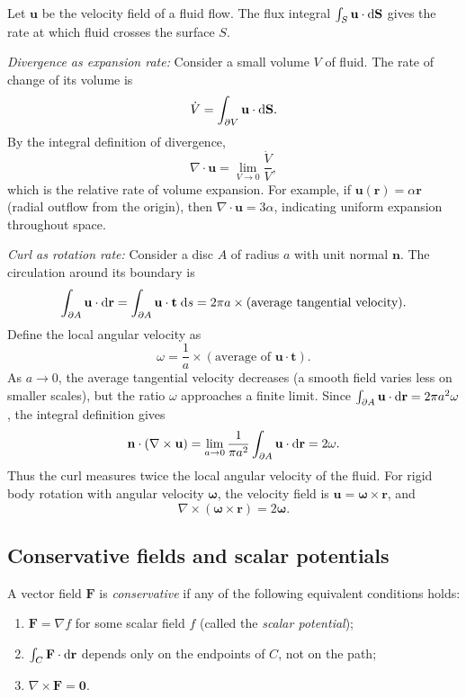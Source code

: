 \documentclass[a4paper]{article}
\begin{document}
\begin{eg}
  Let $\mathbf{u}$ be the velocity field of a fluid flow. The flux integral $\int_S \mathbf{u}\cdot \mathrm{d} \mathbf{S}$ gives the rate at which fluid crosses the surface $S$.

  \emph{Divergence as expansion rate:} Consider a small volume $V$ of fluid. The rate of change of its volume is
  \[
    \dot{V} = \int_{\partial V}\mathbf{u}\cdot \mathrm{d} \mathbf{S}.
  \]
  By the integral definition of divergence,
  \[
    \nabla\cdot \mathbf{u} = \lim_{V\to 0}\frac{\dot{V}}{V},
  \]
  which is the relative rate of volume expansion. For example, if $\mathbf{u}(\mathbf{r}) = \alpha\mathbf{r}$ (radial outflow from the origin), then $\nabla\cdot \mathbf{u} = 3\alpha$, indicating uniform expansion throughout space.

  \emph{Curl as rotation rate:} Consider a disc $A$ of radius $a$ with unit normal $\mathbf{n}$. The circulation around its boundary is
  \[
    \int_{\partial A}\mathbf{u}\cdot \mathrm{d} \mathbf{r} = \int_{\partial A}\mathbf{u}\cdot \mathbf{t} \;\mathrm{d} s = 2\pi a \times (\text{average tangential velocity}).
  \]
  Define the local angular velocity as
  \[
    \omega = \frac{1}{a} \times (\text{average of }\mathbf{u}\cdot \mathbf{t}).
  \]
  As $a \to 0$, the average tangential velocity decreases (a smooth field varies less on smaller scales), but the ratio $\omega$ approaches a finite limit. Since $\int_{\partial A} \mathbf{u}\cdot \mathrm{d} \mathbf{r} = 2\pi a^2 \omega$, the integral definition gives
  \[
    \mathbf{n}\cdot (\nabla \times \mathbf{u}) = \lim_{a \to 0}\frac{1}{\pi a^2}\int_{\partial A}\mathbf{u}\cdot \mathrm{d} \mathbf{r} = 2\omega.
  \]
  Thus the curl measures twice the local angular velocity of the fluid. For rigid body rotation with angular velocity $\boldsymbol\omega$, the velocity field is $\mathbf{u} = \boldsymbol\omega\times \mathbf{r}$, and
  \[
    \nabla\times (\boldsymbol\omega\times \mathbf{r}) = 2\boldsymbol\omega.
  \]
\end{eg}

\subsection{Conservative fields and scalar potentials}
\begin{defi}
  A vector field $\mathbf{F}$ is \emph{conservative} if any of the following equivalent conditions holds:
  \begin{enumerate}
    \item $\mathbf{F} = \nabla f$ for some scalar field $f$ (called the \emph{scalar potential});
    \item $\int_C \mathbf{F}\cdot \mathrm{d} \mathbf{r}$ depends only on the endpoints of $C$, not on the path;
    \item $\nabla \times \mathbf{F} = \mathbf{0}$.
  \end{enumerate}
\end{defi}
\end{document}
